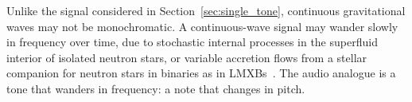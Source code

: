 \documentclass[paper-main.tex]{subfiles}
\begin{document}

Unlike the signal considered in Section~\ref{sec:single_tone}, continuous gravitational waves may not be monochromatic.
A continuous-wave signal may wander slowly in frequency over time, due to stochastic internal processes in the superfluid interior of isolated neutron stars\cite{MelatosDouglassSimula:2015,Jones:2010}, or variable accretion flows from a stellar companion for neutron stars in binaries as in LMXBs~\cite{BildstenTB:1998}. 
The audio analogue is a tone that wanders in frequency: a note that changes in pitch. 
\end{document}
